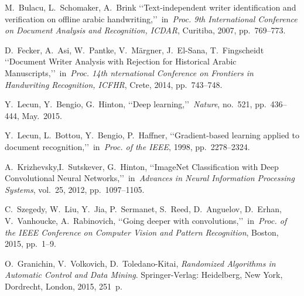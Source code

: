 \documentclass[conference,a4paper,twocolumn]{IEEEtran}
\begin{document}
%
%
%

\begin{thebibliography}{99}

 M.~Bulacu, L.~Schomaker, A.~Brink \lq\lq Text-independent writer identification and verification on offline arabic handwriting,\rq\rq~in~\emph{Proc. 9th International Conference on Document Analysis and Recognition, ICDAR}, Curitiba, 2007, pp.~769--773.

 D.~Fecker, A.~Asi, W.~Pantke, V.~Märgner, J.~El-Sana, T.~Fingscheidt \lq\lq Document Writer Analysis with Rejection for Historical Arabic Manuscripts,\rq\rq~in~\emph{Proc. 14th nternational Conference on Frontiers in Handwriting Recognition, ICFHR}, Crete, 2014, pp.~743--748.

 Y.~Lecun, Y.~Bengio, G.~Hinton, \lq\lq Deep learning,\rq\rq~\emph{Nature}, no.~521, pp.~436--444, May.~2015.

 Y.~Lecun, L.~Bottou, Y.~Bengio, P.~Haffner, \lq\lq Gradient-based learning applied to document recognition,\rq\rq~in~\emph{Proc. of the IEEE}, 1998, pp.~2278--2324.

 A.~Krizhevsky,I.~Sutskever, G.~Hinton, \lq\lq ImageNet Classification with Deep Convolutional Neural Networks,\rq\rq~in~\emph{Advances in Neural Information Processing Systems}, vol.~25, 2012, pp.~1097--1105.

 C.~Szegedy, W.~Liu, Y.~Jia, P.~Sermanet, S.~Reed, D.~Anguelov, D.~Erhan, V.~Vanhoucke, A.~Rabinovich, \lq\lq Going deeper with convolutions,\rq\rq~in~\emph{Proc. of the IEEE Conference on Computer Vision and Pattern Recognition}, Boston, 2015, pp.~1--9.

 O.~Granichin, V.~Volkovich, D.~Toledano-Kitai, \emph{Randomized Algorithms in Automatic Control and Data Mining}.	Springer-Verlag: Heidelberg, New York, Dordrecht, London, 2015, 251~p.

\end{thebibliography}


\end{document}

